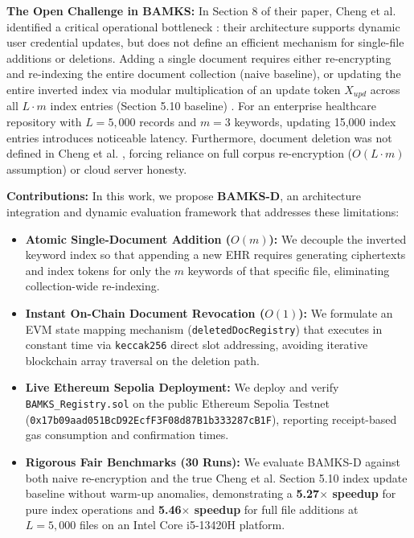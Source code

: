 \documentclass[conference]{IEEEtran}
\begin{document}
\textbf{The Open Challenge in BAMKS:} In Section 8 of their paper, Cheng et al. identified a critical operational bottleneck \cite{cheng2026bamks}: their architecture supports dynamic user credential updates, but does not define an efficient mechanism for single-file additions or deletions. Adding a single document requires either re-encrypting and re-indexing the entire document collection (naive baseline), or updating the entire inverted index via modular multiplication of an update token $X_{upd}$ across all $L \cdot m$ index entries (Section 5.10 baseline) \cite{cheng2026bamks}. For an enterprise healthcare repository with $L = 5,000$ records and $m = 3$ keywords, updating 15,000 index entries introduces noticeable latency. Furthermore, document deletion was not defined in Cheng et al. \cite{cheng2026bamks}, forcing reliance on full corpus re-encryption ($O(L \cdot m)$ assumption) or cloud server honesty.

\textbf{Contributions:} In this work, we propose \textbf{BAMKS-D}, an architecture integration and dynamic evaluation framework that addresses these limitations:
\begin{itemize}
    \item \textbf{Atomic Single-Document Addition ($O(m)$):} We decouple the inverted keyword index so that appending a new EHR requires generating ciphertexts and index tokens for only the $m$ keywords of that specific file, eliminating collection-wide re-indexing.
    \item \textbf{Instant On-Chain Document Revocation ($O(1)$):} We formulate an EVM state mapping mechanism (\texttt{deletedDocRegistry}) that executes in constant time via \texttt{keccak256} direct slot addressing, avoiding iterative blockchain array traversal on the deletion path.
    \item \textbf{Live Ethereum Sepolia Deployment:} We deploy and verify \texttt{BAMKS\_Registry.sol} on the public Ethereum Sepolia Testnet (\texttt{0x17b09aad051BcD92EcfF3F08d87B1b333287cB1F}), reporting receipt-based gas consumption and confirmation times.
    \item \textbf{Rigorous Fair Benchmarks (30 Runs):} We evaluate BAMKS-D against both naive re-encryption and the true Cheng et al. Section 5.10 index update baseline without warm-up anomalies, demonstrating a \textbf{5.27$\times$ speedup} for pure index operations and \textbf{5.46$\times$ speedup} for full file additions at $L=5,000$ files on an Intel Core i5-13420H platform.
\end{itemize}
\end{document}
